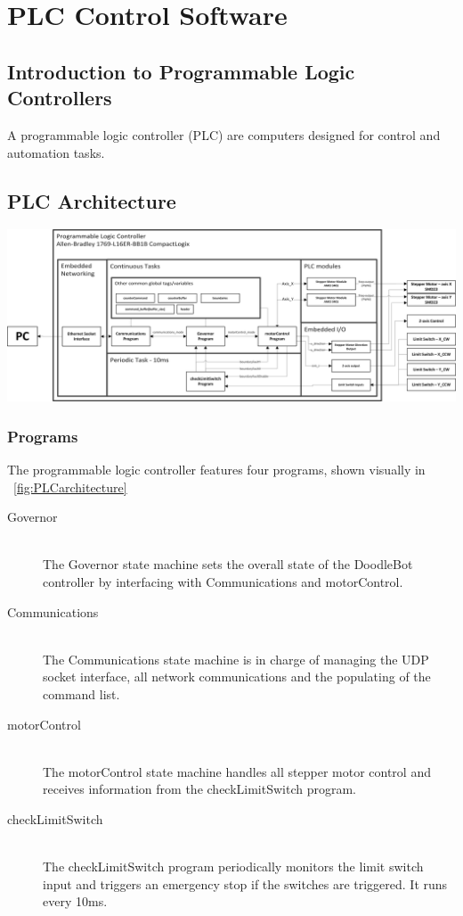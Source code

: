 \section{PLC Control Software}

\subsection{Introduction to Programmable Logic Controllers}
	A programmable logic controller (PLC) are computers designed for control and automation tasks. 
\subsection{PLC Architecture}

\begin{landscape}
		\vspace*{\fill}
		\includegraphics[width=\hsize]{figures/cncMachine/PLC_architecture}
		\label{fig:PLCarchitecture}
		\vspace*{\fill}
\end{landscape}


	\subsubsection{Programs}
		The programmable logic controller features four programs, shown visually in ~\ref{fig:PLCarchitecture}
	
		\begin{description}
			\item[Governor] \hfill \\
				The Governor state machine sets the overall state of the DoodleBot controller by interfacing with Communications and motorControl.
			\item[Communications] \hfill \\
				The Communications state machine is in charge of managing the UDP socket interface, all network communications and the populating of the command list.
			\item[motorControl] \hfill \\
				The motorControl state machine handles all stepper motor control and receives information from the checkLimitSwitch program.
			\item[checkLimitSwitch] \hfill \\
				The checkLimitSwitch program periodically monitors the limit switch input and triggers an emergency stop if the switches are triggered. It runs every 10ms.
		\end{description}
		

